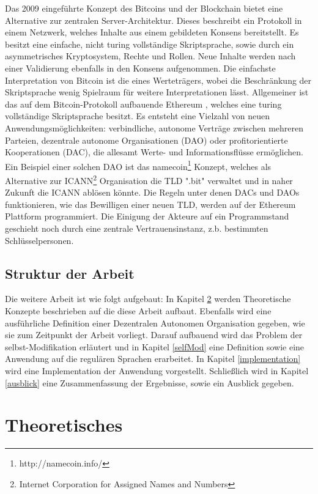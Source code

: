 \documentclass[a4paper,12pt]{report}
\begin{document}
Das 2009 eingeführte Konzept des Bitcoins und der Blockchain\cite{Nakamoto2008} bietet eine Alternative zur zentralen Server-Architektur. Dieses beschreibt ein Protokoll in einem Netzwerk, welches Inhalte aus einem gebildeten Konsens bereitstellt. Es besitzt eine einfache, nicht turing vollständige Skriptsprache, sowie durch ein asymmetrisches Kryptosystem, Rechte und Rollen. Neue Inhalte werden nach einer Validierung ebenfalls in den Konsens aufgenommen. Die einfachste Interpretation von Bitcoin ist die eines Werteträgers, wobei die Beschränkung der Skriptsprache wenig Spielraum für weitere Interpretationen lässt.
Allgemeiner ist das auf dem Bitcoin-Protokoll aufbauende Ethereum\cite{Wood2014} , welches eine turing vollständige Skriptsprache besitzt.
Es entsteht eine Vielzahl von neuen Anwendungsmöglichkeiten: verbindliche, autonome Verträge zwischen mehreren Parteien, dezentrale autonome Organisationen (DAO) oder profitorientierte Kooperationen (DAC), die allesamt Werte- und Informationsflüsse ermöglichen.
Ein Beispiel einer solchen DAO ist das namecoin\footnote{http://namecoin.info/} Konzept, welches als Alternative zur ICANN\footnote{Internet Corporation for Assigned Names and Numbers} Organisation die TLD ".bit" verwaltet und in naher Zukunft die ICANN ablösen könnte.\cite{Corporation2014} Die Regeln unter denen DACs und DAOs funktionieren, wie das Bewilligen einer neuen TLD, werden auf der Ethereum Plattform programmiert.
Die Einigung der Akteure auf ein Programmstand geschieht noch durch eine zentrale Vertrauensinstanz, z.b. bestimmten Schlüsselpersonen.

\section{Struktur der Arbeit}
Die weitere Arbeit ist wie folgt aufgebaut: In Kapitel \ref{theo} werden Theoretische Konzepte beschrieben auf die diese Arbeit aufbaut. Ebenfalls wird eine ausführliche Definition einer Dezentralen Autonomen Organisation gegeben, wie sie zum Zeitpunkt der Arbeit vorliegt. Darauf aufbauend wird das Problem der selbst-Modifikation erläutert und in Kapitel \ref{selfMod} eine Definition sowie eine Anwendung auf die regulären Sprachen erarbeitet. In Kapitel \ref{implementation} wird eine Implementation der Anwendung vorgestellt. Schließlich wird in Kapitel \ref{ausblick} eine Zusammenfassung der Ergebnisse, sowie ein Ausblick gegeben.


\chapter{Theoretisches}
\label{theo}
\end{document}
